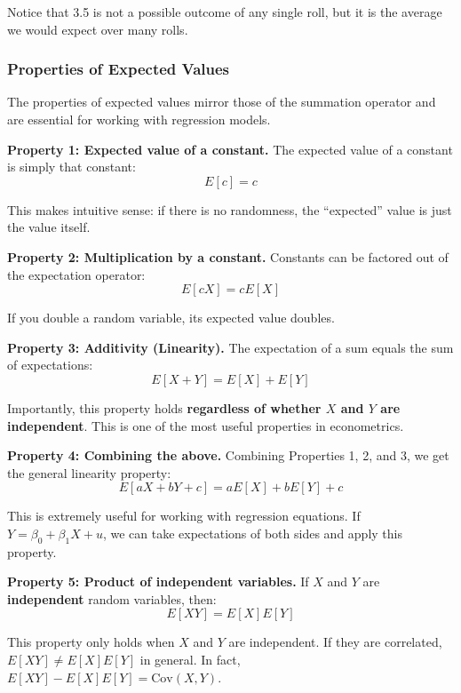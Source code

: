\documentclass[
  letterpaper,
  DIV=11,
  numbers=noendperiod]{scrreprt}
\begin{document}
Notice that 3.5 is not a possible outcome of any single roll, but it is
the average we would expect over many rolls.

\subsubsection{Properties of Expected
Values}\label{properties-of-expected-values}

The properties of expected values mirror those of the summation operator
and are essential for working with regression models.

\textbf{Property 1: Expected value of a constant.} The expected value of
a constant is simply that constant: \[E[c] = c\]

This makes intuitive sense: if there is no randomness, the ``expected''
value is just the value itself.

\textbf{Property 2: Multiplication by a constant.} Constants can be
factored out of the expectation operator: \[E[cX] = cE[X]\]

If you double a random variable, its expected value doubles.

\textbf{Property 3: Additivity (Linearity).} The expectation of a sum
equals the sum of expectations: \[E[X + Y] = E[X] + E[Y]\]

Importantly, this property holds \textbf{regardless of whether \(X\) and
\(Y\) are independent}. This is one of the most useful properties in
econometrics.

\textbf{Property 4: Combining the above.} Combining Properties 1, 2, and
3, we get the general linearity property:
\[E[aX + bY + c] = aE[X] + bE[Y] + c\]

This is extremely useful for working with regression equations. If
\(Y = \beta_0 + \beta_1 X + u\), we can take expectations of both sides
and apply this property.

\textbf{Property 5: Product of independent variables.} If \(X\) and
\(Y\) are \textbf{independent} random variables, then:
\[E[XY] = E[X]E[Y]\]

\begin{tcolorbox}[enhanced jigsaw, arc=.35mm, bottomrule=.15mm, bottomtitle=1mm, breakable, colback=white, colbacktitle=quarto-callout-warning-color!10!white, colframe=quarto-callout-warning-color-frame, coltitle=black, left=2mm, leftrule=.75mm, opacityback=0, opacitybacktitle=0.6, rightrule=.15mm, title=\textcolor{quarto-callout-warning-color}{\faExclamationTriangle}\hspace{0.5em}{Independence Required!}, titlerule=0mm, toprule=.15mm, toptitle=1mm]

This property only holds when \(X\) and \(Y\) are independent. If they
are correlated, \(E[XY] \neq E[X]E[Y]\) in general. In fact,
\(E[XY] - E[X]E[Y] = \text{Cov}(X,Y)\).

\end{tcolorbox}
\end{document}
